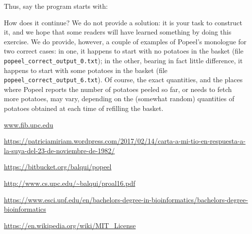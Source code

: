 \documentclass[12pt]{article}
\begin{document}
Thus, say the program starts with:




How does it continue? We do not provide a solution:
it is your task to construct it, and we hope that
some readers will have learned something by doing
this exercise. We do provide, however, a couple of
examples of Popeel's monologue for two correct cases:
in one, it happens to start with no potatoes in the
basket (file {\tt popeel_correct_output_0.txt});
in the other, bearing in fact little difference,
it happens to start with some potatoes 
in the
basket (file {\tt popeel_correct_output_6.txt}).
Of course, the exact quantities, and the places where
Popeel reports the number of potatoes peeled so far,
or needs to fetch more potatoes,
may vary, depending on the (somewhat random) 
quantities of potatoes
obtained at each time of refilling the basket.

\begin{thebibliography}{10}

\url{www.fib.upc.edu}

\url{https://patriciamiriam.wordpress.com/2017/02/14/carta-a-mi-tio-en-respuesta-a-la-suya-del-23-de-noviembre-de-1982/}

\url{https://bitbucket.org/balqui/popeel}

\url{http://www.cs.upc.edu/~balqui/proal16.pdf}

\url{https://www.esci.upf.edu/en/bachelors-degree-in-bioinformatics/bachelors-degree-bioinformatics}

\url{https://en.wikipedia.org/wiki/MIT_License}

\end{thebibliography}
\end{document}
